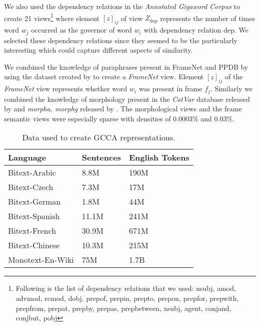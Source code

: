 \documentclass[11pt]{article}
\newcommand{\xline}[0]{\noindent\underline{\makebox[0.1cm][l]{}}}
\begin{document}
We also used the dependency relations in the \textit{Annotated Gigaword Corpus} to
create 21 views\footnote{Following is the list of dependency relations
  that we used:
nsubj, amod, advmod, rcmod, dobj, prep\xline{}of, prep\xline{}in,
prep\xline{}to, prep\xline{}on, prep\xline{}for, prep\xline{}with,
prep\xline{}from, prep\xline{}at, prep\xline{}by, prep\xline{}as,
prep\xline{}between, xsubj, agent, conj\xline{}and, conj\xline{}but, pobj} 
where element $[z]_{ij}$ of view 
$Z_{\textrm{dep}}$ represents the number of times word $w_j$ occurred as the
governor of word $w_i$ with dependency relation $\textrm{dep}$. We
selected these dependency relations since they seemed to be the
particularly interesting which could capture different aspects of
similarity.

We combined the knowledge of paraphrases present in FrameNet and PPDB by
using the dataset created by \cite{rastogi2014augmenting} to create a
\textit{FrameNet} view. Element $[z]_{ij}$ of the \textit{FrameNet}
view represents whether word $w_i$ was present in frame
$f_j$. Similarly we combined the knowledge of morphology present in
the \textit{CatVar} database released by \cite{habash2003catvar} and
\textit{morpha, morphg} released by \cite{minnen2001applied}.
The morphological views and the frame semantic views were especially
sparse with densities of 0.0003\% and 0.03\%.

\begin{table}[htbp]
  \centering
  \begin{tabular}{lll}
    Language & Sentences & English Tokens \\
    \hline
    Bitext-Arabic   & 8.8M   & 190M  \\
    Bitext-Czech    & 7.3M   & 17M   \\
    Bitext-German   & 1.8M   & 44M   \\
    Bitext-Spanish  & 11.1M  & 241M  \\
    Bitext-French   & 30.9M  & 671M  \\
    Bitext-Chinese  & 10.3M  & 215M  \\
    Monotext-En-Wiki& 75M    & 1.7B 
  \end{tabular}  
  \caption{Data used to create GCCA representations.}
  \label{tab:dataperlang}
\end{table}
\end{document}
